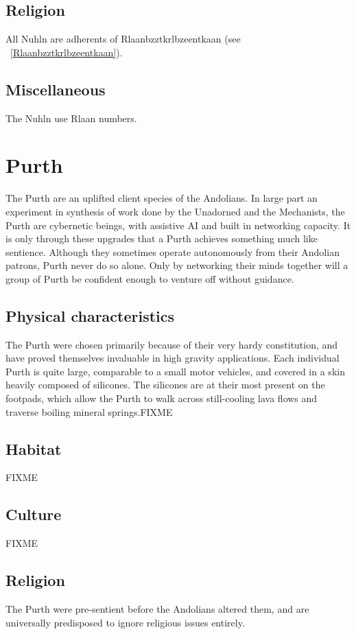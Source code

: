 \subsection{Religion}
All Nuhln are adherents of Rlaanbzztkrlbzeentkaan (see ~\ref{Rlaanbzztkrlbzeentkaan}). 

\subsection{Miscellaneous}
The Nuhln use Rlaan numbers. 

\section{Purth}

The Purth are an uplifted client species of the Andolians. In large
part an experiment in synthesis of work done by the Unadorned and the
Mechanists, the Purth are cybernetic beings, with assistive AI and
built in networking capacity. It is only through these upgrades that a
Purth achieves something much like sentience.  Although they sometimes
operate autonomously from their Andolian patrons, Purth never do so
alone. Only by networking their minds together will a group of Purth
be confident enough to venture off without guidance.

\subsection{Physical characteristics}
The Purth were chosen primarily because of their very hardy
constitution, and have proved themselves invaluable in high gravity
applications. Each individual Purth is quite large, comparable to a
small motor vehicles, and covered in a skin heavily composed of
silicones. The silicones are at their most present on the footpads,
which allow the Purth to walk across still-cooling lava flows and
traverse boiling mineral springs.FIXME

\subsection{Habitat}
FIXME 

\subsection{Culture}
FIXME 

\subsection{Religion}
The Purth were pre-sentient before the Andolians altered them, and are
universally predisposed to ignore religious issues entirely.

